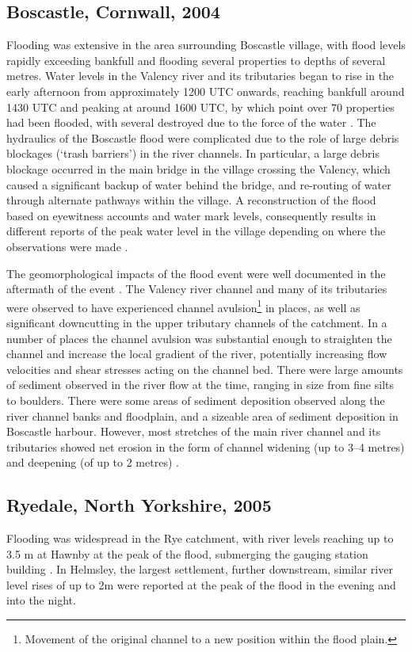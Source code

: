 \subsection{Boscastle, Cornwall, 2004}
Flooding was extensive in the area surrounding Boscastle village, with flood levels rapidly exceeding bankfull and flooding several properties to depths of several metres. Water levels in the Valency river and its tributaries began to rise in the early afternoon from approximately 1200 UTC onwards, reaching bankfull around 1430 UTC and peaking at around 1600 UTC, by which point over 70 properties had been flooded, with several destroyed due to the force of the water \citep{wallingford2005flooding}.
The hydraulics of the Boscastle flood were complicated due to the role of large debris blockages (`trash barriers') in the river channels. In particular, a large debris blockage occurred in the main bridge in the village crossing the Valency, which caused a significant backup of water behind the bridge, and re-routing of water through alternate pathways within the village. A reconstruction of the flood based on eyewitness accounts and water mark levels, consequently results in different reports of the peak water level in the village depending on where the observations were made \citep{wallingford2005flooding}. 

The geomorphological impacts of the flood event were well documented in the aftermath of the event \citep{wallingford2005flooding}. The Valency river channel and many of its tributaries were observed to have experienced channel avulsion\footnote{Movement of the original channel to a new position within the flood plain.} in places, as well as significant downcutting in the upper tributary channels of the catchment. In a number of places the channel avulsion was substantial enough to straighten the channel and increase the local gradient of the river, potentially increasing flow velocities and shear stresses acting on the channel bed. There were large amounts of sediment observed in the river flow at the time, ranging in size from fine silts to boulders. There were some areas of sediment deposition observed along the river channel banks and floodplain, and a sizeable area of sediment deposition in Boscastle harbour. However, most stretches of the main river channel and its tributaries showed net erosion in the form of channel widening (up to 3--4 metres) and deepening (of up to 2 metres) \citep{wallingford2005flooding}.

\subsection{Ryedale, North Yorkshire, 2005}
Flooding was widespread in the Rye catchment, with river levels reaching up to 3.5 m at Hawnby at the peak of the flood, submerging the gauging station building \citep{wass2008investigation}. In Helmsley, the largest settlement, further downstream, similar river level rises of up to 2m were reported at the peak of the flood in the evening and into the night. 

